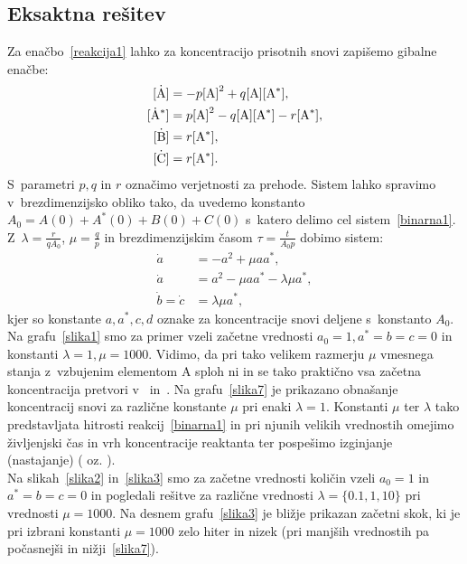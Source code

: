 \documentclass[a4paper,pdftex,12pt]{article}
\numberwithin{figure}{section} %
\begin{document}
\subsection{Eksaktna rešitev}
Za enačbo~\ref{reakcija1} lahko za koncentracijo prisotnih snovi zapišemo gibalne enačbe:
\begin{align}\label{binarna1}
    \dot{\ce{[A]}} &= -p \ce{[A]}^2 + q \ce{[A]} \ce{[A^*]}, \\
    \ce{[\dot{\mathrm{A}}^*]} &= p \ce{[A]}^2 - q \ce{[A]} \ce{[A^*]} -r \ce{[A^*]}, \\
    \dot{\ce{[B]}} &= r \ce{[A^*]}, \\
    \dot{\ce{[C]}} &= r \ce{[A^*]}.
\end{align}
S~parametri $p,q$ in $r$ označimo verjetnosti za prehode. Sistem lahko spravimo 
v~brezdimenzijsko obliko tako, da uvedemo konstanto $A_0 = A(0)+A^*(0)+B(0)+C(0)$ s~katero 
delimo cel sistem~\ref{binarna1}. Z~$\lambda=\frac{r}{qA_0}$, $\mu = \frac{q}{p}$ in
brezdimenzijskim časom $\tau = \frac{t}{A_0 p}$ dobimo sistem:
\begin{align}\label{binarna2}
    \dot{a} &= -a^2 + \mu a a^*, \\
    \dot{a} &= a^2 - \mu a a^* - \lambda \mu a^*, \\
    \dot{b} = \dot{c} &= \lambda \mu a^*,
\end{align}
kjer so konstante $a, a^*, c, d$ oznake za koncentracije snovi deljene s~konstanto $A_0$.
Na grafu~\ref{slika1} smo za primer vzeli začetne vrednosti $a_0=1, a^*=b=c=0$ in konstanti
$\lambda = 1, \mu =1000$. Vidimo, da pri tako velikem razmerju $\mu$ vmesnega stanja
z~vzbujenim elementom A sploh ni in se tako praktično vsa začetna koncentracija \ce{[A]} 
pretvori v~\ce{[B]} in~\ce{[C]}. Na grafu~\ref{slika7} je prikazano obnašanje koncentracij
snovi za različne konstante $\mu$ pri enaki $\lambda=1$. Konstanti $\mu$ ter $\lambda$ tako
predstavljata hitrosti reakcij~\ref{binarna1} in pri njunih velikih vrednostih 
omejimo življenjski čas in vrh koncentracije reaktanta  ter pospešimo izginjanje 
(nastajanje)  ( oz. ).\\
Na slikah~\ref{slika2} in~\ref{slika3} smo za začetne vrednosti količin vzeli $a_0=1$ in
$a^*=b=c=0$ in pogledali rešitve za različne vrednosti $\lambda=\{0.1, 1, 10\}$ pri
vrednosti $\mu = 1000$. Na desnem grafu~\ref{slika3} je bližje prikazan začetni skok,
ki je pri izbrani konstanti $\mu=1000$ zelo hiter in nizek (pri manjših vrednostih
pa počasnejši in nižji~\ref{slika7}).
\end{document}
